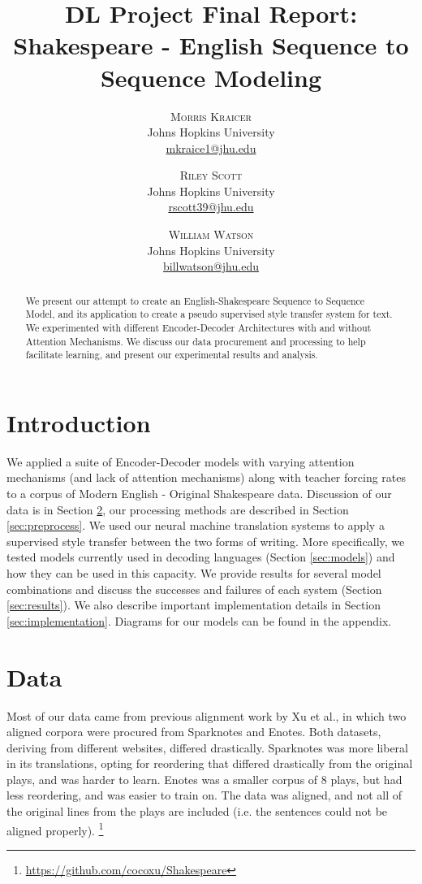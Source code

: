 \documentclass[twoside,twocolumn]{article}
\title{DL Project Final Report:\\
       Shakespeare - English Sequence to Sequence Modeling}
\author{%
\textsc{Morris Kraicer} \\[1ex]
\normalsize Johns Hopkins University \\
\normalsize \href{mailto:mkraice1@jhu.edu}{mkraice1@jhu.edu}
 \and
 \textsc{Riley Scott} \\[1ex]
\normalsize Johns Hopkins University \\
\normalsize \href{mailto:rscott39@jhu.edu}{rscott39@jhu.edu}
 \and
  \textsc{William Watson} \\[1ex]
\normalsize Johns Hopkins University \\
\normalsize \href{mailto:billwatson@jhu.edu}{billwatson@jhu.edu}
}
\date{}%
\begin{document}
\maketitle



\begin{abstract}
\noindent
We present our attempt to create an English-Shakespeare Sequence to Sequence
Model, and its application to create a pseudo supervised style transfer system
for text. We experimented with different Encoder-Decoder Architectures with and
without Attention Mechanisms. We discuss our data procurement and processing
to help facilitate learning, and present our experimental results and analysis.
\end{abstract}

\section{Introduction}
We applied a suite of Encoder-Decoder models with varying attention
mechanisms (and lack of attention mechanisms) along with teacher forcing rates
to a corpus of Modern English - Original Shakespeare data. Discussion of our
data is in Section \ref{sec:data},
our processing methods are described in Section \ref{sec:preprocess}.
We used our neural machine translation systems to
apply a supervised style transfer between the two forms of writing.
More specifically, we tested models currently
used in decoding languages (Section \ref{sec:models}) and how they can
be used in this capacity. We provide results for several model
combinations and discuss the successes and failures of each system
(Section \ref{sec:results}). We also describe important implementation details
in Section \ref{sec:implementation}.
Diagrams for our models can be found in the appendix.
\section{Data}
\label{sec:data}
Most of our data came from previous alignment work
by Xu et al.\cite{xu2012paraphrasing}, in which
two aligned corpora were procured from Sparknotes and Enotes. Both datasets,
deriving from different websites, differed drastically. Sparknotes was more
liberal in its translations, opting for reordering that differed drastically
from the original plays, and was harder to learn. Enotes was a smaller corpus
of 8 plays, but had less reordering, and was easier to train on.
The data was aligned, and not all of the original lines
from the plays are included (i.e. the sentences could not be aligned properly).
\footnote{\url{https://github.com/cocoxu/Shakespeare}}
\end{document}
